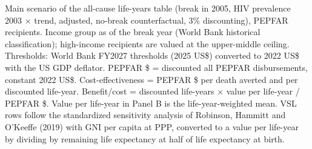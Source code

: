 \begin{table}[htbp]
\begin{minipage}{\textwidth}\footnotesize Main scenario of the all-cause life-years table (break in 2005, HIV prevalence 2003 $\times$ trend, adjusted, no-break counterfactual, 3\% discounting), PEPFAR recipients. Income group as of the break year (World Bank historical classification); high-income recipients are valued at the upper-middle ceiling. Thresholds: World Bank FY2027 thresholds (2025 US\$) converted to 2022 US\$ with the US GDP deflator. PEPFAR \$ = discounted all PEPFAR disbursements, constant 2022 US\$. Cost-effectiveness = PEPFAR \$ per death averted and per discounted life-year. Benefit/cost = discounted life-years $\times$ value per life-year / PEPFAR \$. Value per life-year in Panel B is the life-year-weighted mean. VSL rows follow the standardized sensitivity analysis of Robinson, Hammitt and O'Keeffe (2019) with GNI per capita at PPP, converted to a value per life-year by dividing by remaining life expectancy at half of life expectancy at birth.\end{minipage}
\end{table}
